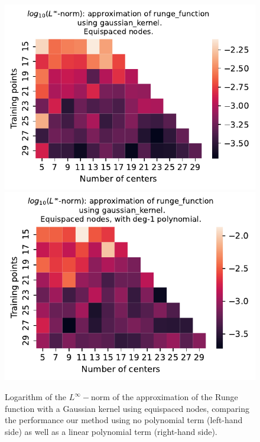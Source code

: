 \documentclass[12pt]{report} %
\begin{document}
\begin{figure}[ht]
    \centering
    
    \includegraphics[width=.49\textwidth]{imagenes/experiments/1d/variational/runge_function-Kgaussian_kernel-Equi.pdf}
    \includegraphics[width=.49\textwidth]{imagenes/experiments/1d/variational/runge_function-Kgaussian_kernel-Poly-Equi.pdf}
    \caption{Logarithm of the $L^\infty-$norm of the approximation of the Runge function with a Gaussian kernel using equispaced nodes, comparing the performance our method using no polynomial term (left-hand side) as well as a linear polynomial term (right-hand side).}
    \label{fig:runge-gaussian-comparison-poly-equi}
\end{figure}


    


\end{document}
